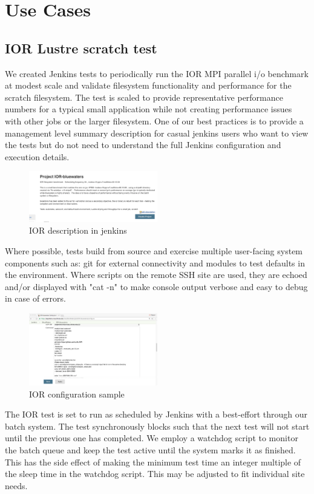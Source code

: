 \documentclass[10pt, conference, compsocconf]{IEEEtran}
\begin{document}
\section{Use Cases}
\label{sec:results}
\subsection{IOR Lustre scratch test}
We created Jenkins tests to periodically run the IOR MPI parallel i/o benchmark at modest scale and validate filesystem functionality and performance for the scratch filesystem. The test is scaled to provide representative performance numbers for a typical small application while not creating performance issues with other jobs or the larger filesystem.  One of our best practices is to provide a management level summary description for casual jenkins users who want to view the tests but do not need to understand the full Jenkins configuration and execution details.  
\begin{figure}[H]
\centering
\includegraphics[width=0.5\textwidth]{IOR-bluewaters-descr}
\caption{ IOR description in jenkins }
\label{fig:IOR-bluewaters-descr}
\end{figure}
Where possible, tests build from source and exercise multiple user-facing system components such as: git for external connectivity and modules to test defaults in the environment.  Where scripts on the remote SSH site are used, they are echoed and/or displayed with "cat -n" to make console output verbose and easy to debug in case of errors.  
\begin{figure}[H]
\centering
\includegraphics[width=0.5\textwidth]{IOR-configuration-sample}
\caption{ IOR configuration sample }
\label{fig:IOR-configuration-sample}
\end{figure}
The IOR test is set to run as scheduled by Jenkins with a best-effort through our batch system.  The test synchronously blocks such that the next test will not start until the previous one has completed.  We employ a watchdog script to monitor the batch queue and keep the test active until the system marks it as finished.  This has the side effect of making the minimum test time an integer multiple of the sleep time in the watchdog script.  This may be adjusted to fit individual site needs.
\end{document}
